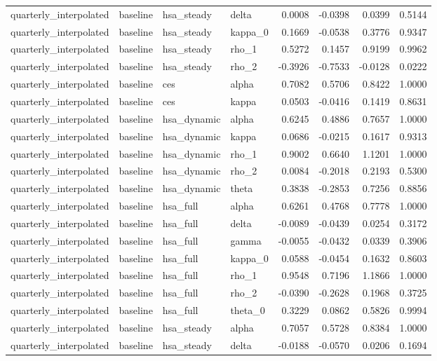 \begin{tabular}{llllrrrr}
quarterly\_interpolated & baseline & hsa\_steady & delta & 0.0008 & -0.0398 & 0.0399 & 0.5144 \\
quarterly\_interpolated & baseline & hsa\_steady & kappa\_0 & 0.1669 & -0.0538 & 0.3776 & 0.9347 \\
quarterly\_interpolated & baseline & hsa\_steady & rho\_1 & 0.5272 & 0.1457 & 0.9199 & 0.9962 \\
quarterly\_interpolated & baseline & hsa\_steady & rho\_2 & -0.3926 & -0.7533 & -0.0128 & 0.0222 \\
quarterly\_interpolated & baseline & ces & alpha & 0.7082 & 0.5706 & 0.8422 & 1.0000 \\
quarterly\_interpolated & baseline & ces & kappa & 0.0503 & -0.0416 & 0.1419 & 0.8631 \\
quarterly\_interpolated & baseline & hsa\_dynamic & alpha & 0.6245 & 0.4886 & 0.7657 & 1.0000 \\
quarterly\_interpolated & baseline & hsa\_dynamic & kappa & 0.0686 & -0.0215 & 0.1617 & 0.9313 \\
quarterly\_interpolated & baseline & hsa\_dynamic & rho\_1 & 0.9002 & 0.6640 & 1.1201 & 1.0000 \\
quarterly\_interpolated & baseline & hsa\_dynamic & rho\_2 & 0.0084 & -0.2018 & 0.2193 & 0.5300 \\
quarterly\_interpolated & baseline & hsa\_dynamic & theta & 0.3838 & -0.2853 & 0.7256 & 0.8856 \\
quarterly\_interpolated & baseline & hsa\_full & alpha & 0.6261 & 0.4768 & 0.7778 & 1.0000 \\
quarterly\_interpolated & baseline & hsa\_full & delta & -0.0089 & -0.0439 & 0.0254 & 0.3172 \\
quarterly\_interpolated & baseline & hsa\_full & gamma & -0.0055 & -0.0432 & 0.0339 & 0.3906 \\
quarterly\_interpolated & baseline & hsa\_full & kappa\_0 & 0.0588 & -0.0454 & 0.1632 & 0.8603 \\
quarterly\_interpolated & baseline & hsa\_full & rho\_1 & 0.9548 & 0.7196 & 1.1866 & 1.0000 \\
quarterly\_interpolated & baseline & hsa\_full & rho\_2 & -0.0390 & -0.2628 & 0.1968 & 0.3725 \\
quarterly\_interpolated & baseline & hsa\_full & theta\_0 & 0.3229 & 0.0862 & 0.5826 & 0.9994 \\
quarterly\_interpolated & baseline & hsa\_steady & alpha & 0.7057 & 0.5728 & 0.8384 & 1.0000 \\
quarterly\_interpolated & baseline & hsa\_steady & delta & -0.0188 & -0.0570 & 0.0206 & 0.1694 \\

\end{tabular}
